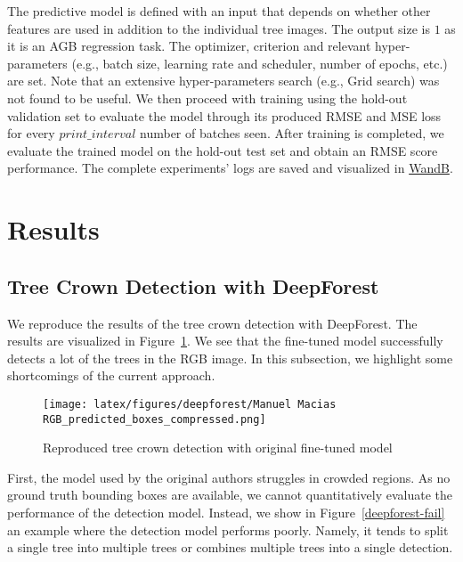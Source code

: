 \documentclass[10pt,twocolumn,letterpaper]{article}
\begin{document}
The predictive model is defined with an input that depends on whether other features are used in addition to the individual tree images. The output size is $1$ as it is an AGB regression task. The optimizer, criterion and relevant hyper-parameters (e.g., batch size, learning rate and scheduler, number of epochs, etc.) are set. Note that an extensive hyper-parameters search (e.g., Grid search) was not found to be useful. We then proceed with training using the hold-out validation set to evaluate the model through its produced RMSE and MSE loss for every $print\_interval$ number of batches seen. After training is completed, we evaluate the trained model on the hold-out test set and obtain an RMSE score performance. The complete experiments' logs are saved and visualized in \href{https://wandb.ai}{WandB}.

\section{Results}
\label{sec:result}

\subsection{Tree Crown Detection with DeepForest}
We reproduce the results of the tree crown detection with DeepForest.
The results are visualized in Figure~\ref{deepforest-detection}.
We see that the fine-tuned model successfully detects a lot of the trees in the RGB image.
In this subsection, we highlight some shortcomings of the current approach.

\begin{figure}
\centering
\texttt{[image: latex/figures/deepforest/Manuel Macias RGB\_predicted\_boxes\_compressed.png]}  
\caption{Reproduced tree crown detection with original fine-tuned model}
\label{deepforest-detection}
\end{figure}

First, the model used by the original authors struggles in crowded regions.
As no ground truth bounding boxes are available, we cannot quantitatively evaluate the performance of the detection model.
Instead, we show in Figure~\ref{deepforest-fail} an example where the detection model performs poorly.
Namely, it tends to split a single tree into multiple trees or combines multiple trees into a single detection.
\end{document}
